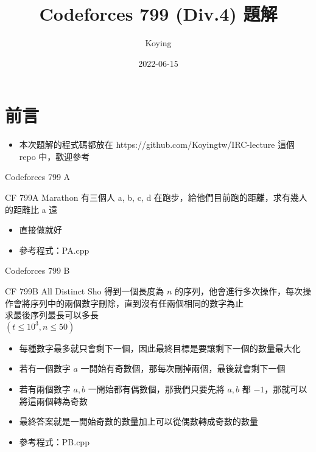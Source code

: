 \documentclass[aspectratio=169]{beamer}
\title{Codeforces 799 (Div.4) 題解}
\author{Koying}
\date{2022-06-15}
\begin{document}
    \begin{frame}
        \titlepage
    \end{frame}


\section{前言}       

    \begin{frame}
    
    	\begin{itemize}
    		\item 本次題解的程式碼都放在 https://github.com/Koyingtw/IRC-lecture 這個 repo 中，歡迎參考
    	\end{itemize}
    	
    \end{frame}
    
    \begin{frame}{Codeforces 799 A}
    	\begin{block}{CF 799A Marathon}
    		有三個人 a, b, c, d 在跑步，給他們目前跑的距離，求有幾人的距離比 a 遠
    	\end{block}

		\begin{itemize}
			\item 直接做就好
			\item 參考程式：PA.cpp
		\end{itemize}		    	
    \end{frame}
    
    \begin{frame}{Codeforces 799 B}
    	\begin{block}{CF 799B All Distinct}
    		Sho 得到一個長度為 $n$ 的序列，他會進行多次操作，每次操作會將序列中的兩個數字刪除，直到沒有任兩個相同的數字為止\\
    		求最後序列最長可以多長\\
    		$(t \le 10^3, n \le 50)$
    	\end{block}
    	
    	\begin{itemize}
    		\item 每種數字最多就只會剩下一個，因此最終目標是要讓剩下一個的數量最大化
    		\item 若有一個數字 $a$ 一開始有奇數個，那每次刪掉兩個，最後就會剩下一個
    		\item 若有兩個數字 $a,b$ 一開始都有偶數個，那我們只要先將 $a,b$ 都 $-1$，那就可以將這兩個轉為奇數
    		\item 最終答案就是一開始奇數的數量加上可以從偶數轉成奇數的數量
    		\item 參考程式：PB.cpp
    	\end{itemize}
    \end{frame}
    
\end{document}
